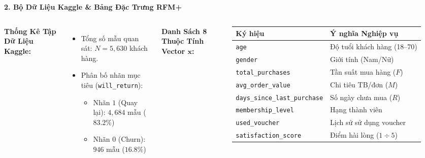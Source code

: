\documentclass[10pt, aspectratio=169]{beamer}
\begin{document}
\begin{frame}{\textbf{2. Bộ Dữ Liệu Kaggle \& Bảng Đặc Trưng RFM+}}
    \begin{columns}
        \textbf{Thống Kê Tập Dữ Liệu Kaggle:}
        \begin{itemize}
            \item Tổng số mẫu quan sát: $N = 5,630$ khách hàng.
            \item Phân bố nhãn mục tiêu (\texttt{will\_return}):
            \begin{itemize}
                \item Nhãn $1$ (Quay lại): $4,684$ mẫu ($83.2\%$)
                \item Nhãn $0$ (Churn): $946$ mẫu ($16.8\%$)
            \end{itemize}
        \end{itemize}

        \textbf{Danh Sách 8 Thuộc Tính Vector $\mathbf{x}$:}
        \begin{table}
            \small
            \begin{tabular}{ll}
                \toprule
                \textbf{Ký hiệu} & \textbf{Ý nghĩa Nghiệp vụ} \\
                \midrule
                \texttt{age} & Độ tuổi khách hàng (18--70) \\
                \texttt{gender} & Giới tính (Nam/Nữ) \\
                \texttt{total\_purchases} & Tần suất mua hàng ($F$) \\
                \texttt{avg\_order\_value} & Chi tiêu TB/đơn ($M$) \\
                \texttt{days\_since\_last\_purchase} & Số ngày chưa mua ($R$) \\
                \texttt{membership\_level} & Hạng thành viên \\
                \texttt{used\_voucher} & Lịch sử sử dụng voucher \\
                \texttt{satisfaction\_score} & Điểm hài lòng ($1 \div 5$) \\
                \bottomrule
            \end{tabular}
        \end{table}
    \end{columns}
\end{frame}
\end{document}
